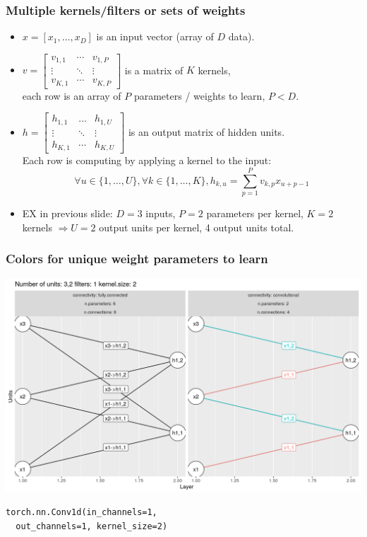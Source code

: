 \documentclass{beamer}
\begin{document}
\begin{frame}
  \frametitle{Multiple kernels/filters or sets of weights}
  \begin{itemize}
  \item $x = [ x_1, \dots, x_D ]$ is an input vector (array of $D$ data).
  \item $v = \begin{bmatrix}
      v_{1,1} & \cdots & v_{1,P} \\
      \vdots & \ddots & \vdots \\
      v_{K,1} & \cdots & v_{K,P}
    \end{bmatrix}$ is a matrix of $K$ kernels,\\each row is an array of
    $P$ parameters / weights to learn, $P<D$.
  \item $h = \begin{bmatrix}
      h_{1,1} & \dots & h_{1,U} \\
      \vdots & \ddots & \vdots \\
      h_{K,1} & \cdots & h_{K,U}
      \end{bmatrix}$ is an output matrix of
      hidden units. \\
      Each row is computing by applying a kernel to the input:
      $$
      \forall u\in\{1,\dots,U\},
      \forall k\in\{1,\dots,K\},
      h_{k,u} = \sum_{p=1}^P v_{k,p} x_{u+p-1}
      $$
    \item EX in previous slide: $D=3$ inputs, $P=2$ parameters per
      kernel, $K=2$ kernels $\Rightarrow U=2$ output units per kernel,
      4 output units total.
  \end{itemize}
\end{frame}

\begin{frame}[fragile]
  \frametitle{Colors for unique weight parameters to learn}
  \includegraphics[width=\textwidth]{figure-convolutional-filters-3-2-1}
\begin{verbatim}
torch.nn.Conv1d(in_channels=1, 
  out_channels=1, kernel_size=2)
\end{verbatim}

\end{frame}
\end{document}

